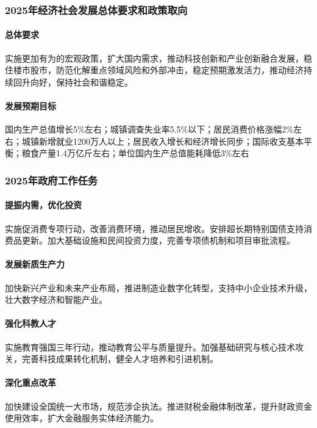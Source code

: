 \subsubsection{2025年经济社会发展总体要求和政策取向}

\paragraph{总体要求} 实施更加有为的宏观政策，扩大国内需求，推动科技创新和产业创新融合发展，稳住楼市股市，防范化解重点领域风险和外部冲击，稳定预期激发活力，推动经济持续回升向好，保持社会和谐稳定。

\paragraph{发展预期目标} 国内生产总值增长5\%左右；城镇调查失业率5.5\%以下；居民消费价格涨幅2\%左右；城镇新增就业1200万人以上；居民收入增长和经济增长同步；国际收支基本平衡；粮食产量1.4万亿斤左右；单位国内生产总值能耗降低3\%左右

\subsubsection{2025年政府工作任务}


\paragraph{提振内需，优化投资}
实施促消费专项行动，改善消费环境，推动居民增收。安排超长期特别国债支持消费品更新。加大基础设施和民间投资力度，完善专项债机制和项目审批流程。

\paragraph{发展新质生产力}
加快新兴产业和未来产业布局，推进制造业数字化转型，支持中小企业技术升级，壮大数字经济和智能产业。

\paragraph{强化科教人才}
实施教育强国三年行动，推动教育公平与质量提升。加强基础研究与核心技术攻关，完善科技成果转化机制，健全人才培养和引进机制。

\paragraph{深化重点改革}
加快建设全国统一大市场，规范涉企执法。推进财税金融体制改革，提升财政资金使用效率，扩大金融服务实体经济能力。

